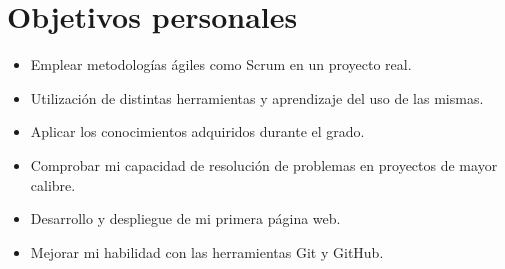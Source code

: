 \section{Objetivos personales}
\begin{itemize}
    \item Emplear metodologías ágiles como Scrum en un proyecto real.
    \item Utilización de distintas herramientas y aprendizaje del uso de las mismas.
    \item Aplicar los conocimientos adquiridos durante el grado.
    \item Comprobar mi capacidad de resolución de problemas en proyectos de mayor calibre.
    \item Desarrollo y despliegue de mi primera página web.
    \item Mejorar mi habilidad con las herramientas Git y GitHub.
\end{itemize}